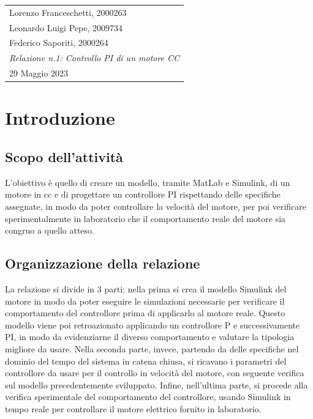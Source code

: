 \documentclass[a4paper, 12pt, Arial]{article}
\newcommand{\class}{Laboratorio di Automatica}
\newcommand{\expT}{Controllo PI di un motore CC}
\newcommand{\repN}{1}
\newcommand{\stud}{Lorenzo Franceschetti, 2000263\\ Leonardo Luigi Pepe, 2009734\\ Federico Saporiti, 2000264}
\newcommand{\dateD}{29 Maggio 2023}
\begin{document}

\begin{center}
\begin{tabular}{| p{\textwidth} |}
    \hline
    \large
    \vspace{-2pt}
    \stud \hfill
    \Large
    \begin{center}
    {\color{BrickRed}
        \textsl{\class}\\
        \textsl{Relazione n.\repN: \expT}\\
        \large
        \dateD}
    \vspace{-4mm}
    \end{center}\\
    \hline
\end{tabular}
\end{center}

\section{Introduzione}
\subsection{Scopo dell'attività}
L'obiettivo è quello di creare un modello, tramite MatLab e Simulink, di un motore in cc e di progettare un controllore PI rispettando delle specifiche assegnate, in modo da poter controllare la velocità del motore, per poi verificare sperimentalmente in laboratorio che il comportamento reale del motore sia congruo a quello atteso.
\subsection{Organizzazione della relazione}
La relazione si divide in 3 parti: nella prima si crea il modello Simulink del motore in modo da poter eseguire le simulazioni necessarie per verificare il comportamento del controllore prima di applicarlo al motore reale. Questo modello viene poi retroazionato applicando un controllore P e successivamente PI, in modo da evidenziarne il diverso comportamento e valutare la tipologia migliore da usare. Nella seconda parte, invece, partendo da delle specifiche nel dominio del tempo del sistema in catena chiusa, si ricavano i parametri del controllore da usare per il controllo in velocità del motore, con seguente verifica sul modello precedentemente sviluppato. Infine, nell'ultima parte, si procede alla verifica sperimentale del comportamento del controllore, usando Simulink in tempo reale per controllare il motore elettrico fornito in laboratorio.
\end{document}
